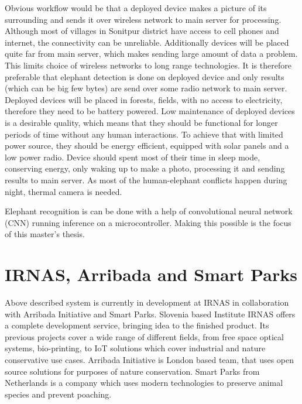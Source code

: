 Obvious workflow would be that a deployed device makes a picture of its surrounding and sends it over wireless network to main server for processing.
Although most of villages in Sonitpur district have access to cell phones and internet, the connectivity can be unreliable\cite{wildlabs-elephants}. 
Additionally devices will be placed quite far from main server, which makes sending large amount of data a problem. 
This limits choice of wireless networks to long range technologies.
It is therefore preferable that elephant detection is done on deployed device and only results (which can be big few bytes) are send over some radio network to main server.
Deployed devices will be placed in forests, fields, with no access to electricity, therefore they need to be battery powered.
Low maintenance of deployed devices is a desirable quality, which means that they should be functional for longer periods of time without any human interactions.
To achieve that with limited power source, they should be energy efficient, equipped with solar panels and a low power radio.
Device should spent most of their time in sleep mode, conserving energy, only waking up to make a photo, processing it and sending results to main server.
As most of the human-elephant conflicts happen during night\cite{wildlabs-elephants}, thermal camera is needed.

Elephant recognition is can be done with a help of convolutional neural network (CNN) running inference on a microcontroller. 
Making this possible is the focus of this master's thesis.


\section{ IRNAS, Arribada and Smart Parks}

Above described system is currently in development at IRNAS in collaboration with Arribada Initiative and Smart Parks.
Slovenia based Institute IRNAS offers a complete development service, bringing idea to the finished product. 
Its previous projects cover a wide range of different fields, from free space optical systems, bio-printing, to IoT solutions which cover industrial and nature conservative use cases.
Arribada Initiative is London based team, that uses open source solutions for purposes of nature conservation.
Smart Parks from Netherlands is a company which uses modern technologies to preserve animal species and prevent poaching.
